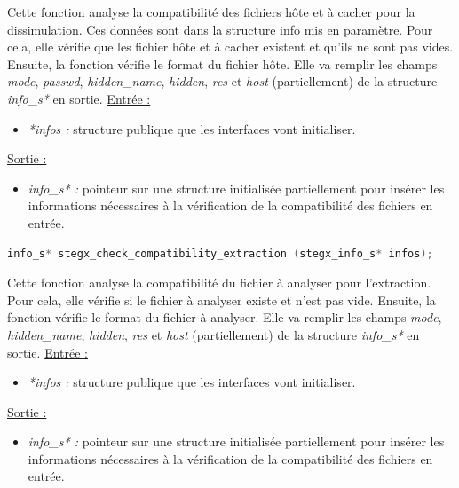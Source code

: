\documentclass[11pt]{article}
\begin{document}
Cette fonction analyse la compatibilité des fichiers hôte et à cacher pour
la dissimulation. Ces données sont dans la structure info mis en paramètre. 
Pour cela, elle vérifie que les fichier hôte et à cacher existent et qu'ils 
ne sont pas vides. Ensuite, la fonction vérifie le format du fichier hôte. 
Elle va remplir les champs \textit{mode}, \textit{passwd}, \textit{hidden\_name}, \textit{hidden},
\textit{res} et \textit{host} (partiellement) de la structure
\textit{info\_s*} en sortie. 
\newline
\underline{Entrée :}
\begin{itemize}
\item \textit{*infos :} structure publique que les interfaces vont initialiser.
\end{itemize}
\underline{Sortie :}
\begin{itemize}
\item \textit{info\_s* :} pointeur sur une structure initialisée 
partiellement pour insérer les informations nécessaires à la vérification 
de la compatibilité des fichiers en entrée. 
\newline 
\end{itemize}

\begin{lstlisting}[language=c]
info_s* stegx_check_compatibility_extraction (stegx_info_s* infos);
\end{lstlisting}

Cette fonction analyse la compatibilité du fichier à analyser pour l'extraction. 
Pour cela, elle vérifie si le fichier à analyser existe et n'est pas vide. 
Ensuite, la fonction vérifie le format du fichier à analyser. 
Elle va remplir les champs \textit{mode}, \textit{hidden\_name}, \textit{hidden},
\textit{res} et \textit{host} (partiellement) de la structure
\textit{info\_s*} en sortie. 
\newline
\underline{Entrée :}
\begin{itemize}
\item \textit{*infos :} structure publique que les interfaces vont initialiser.
\end{itemize}
\underline{Sortie :}
\begin{itemize}
\item \textit{info\_s* :} pointeur sur une structure initialisée 
partiellement pour insérer les informations nécessaires à la vérification 
de la compatibilité des fichiers en entrée. 
\newline 
\end{itemize}
\end{document}
